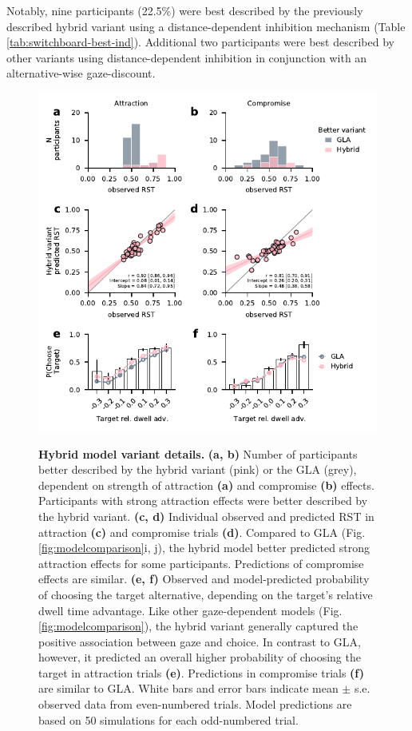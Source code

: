 \documentclass[11pt, a4paper]{article}
\begin{document}
Notably, nine participants (22.5\%) were best described by the previously described hybrid variant using a distance-dependent inhibition mechanism (Table \ref{tab:switchboard-best-ind}). Additional two participants were best described by other variants using distance-dependent inhibition in conjunction with an alternative-wise gaze-discount.

\begin{figure}
\caption{\textbf{Hybrid model variant details.} \textbf{(a, b)} Number of participants better described by the hybrid variant (pink) or the GLA (grey), dependent on strength of attraction \textbf{(a)} and compromise \textbf{(b)} effects. Participants with strong attraction effects were better described by the hybrid variant. \textbf{(c, d)} Individual observed and predicted RST in attraction \textbf{(c)} and compromise trials \textbf{(d)}. Compared to GLA (Fig. \ref{fig:modelcomparison}i, j), the hybrid model better predicted strong attraction effects for some participants. Predictions of compromise effects are similar. \textbf{(e, f)} Observed and model-predicted probability of choosing the target alternative, depending on the target’s relative dwell time advantage. Like other gaze-dependent models (Fig. \ref{fig:modelcomparison}), the hybrid variant generally captured the positive association between gaze and choice. In contrast to GLA, however, it predicted an overall higher probability of choosing the target in attraction trials \textbf{(e)}. Predictions in compromise trials \textbf{(f)} are similar to GLA. White bars and error bars indicate mean $\pm$ s.e. observed data from even-numbered trials. Model predictions are based on 50 simulations for each odd-numbered trial.}
\includegraphics[scale=1]{../figures/5-hybrid-variant.pdf}
\label{fig:hybrid}
\end{figure}
\end{document}
